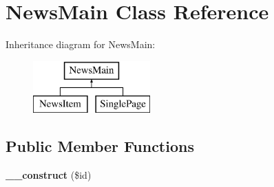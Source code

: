 \hypertarget{class_news_main}{}\section{News\+Main Class Reference}
\label{class_news_main}
Inheritance diagram for News\+Main\+:\begin{figure}[H]
\begin{center}
\leavevmode
\includegraphics[height=2.000000cm]{class_news_main}
\end{center}
\end{figure}
\subsection*{Public Member Functions}
\begin{DoxyCompactItemize}
\item 
\hypertarget{class_news_main_a1340871f436b81e1f225567b6cce4e79}{}{\bfseries \+\_\+\+\_\+construct} (\$id)\label{class_news_main_a1340871f436b81e1f225567b6cce4e79}

\end{DoxyCompactItemize}
